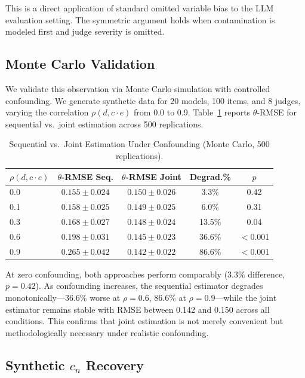 \documentclass[11pt]{article}
\newcommand{\cn}{c_n}
\begin{document}
This is a direct application of standard omitted variable bias \citep{angrist2009mostly} to the LLM evaluation setting. The symmetric argument holds when contamination is modeled first and judge severity is omitted.

\subsection{Monte Carlo Validation}

We validate this observation via Monte Carlo simulation with controlled confounding.
We generate synthetic data for 20 models, 100 items, and 8 judges, varying the correlation $\rho(d, c \cdot e)$ from 0.0 to 0.9.
Table~\ref{tab:mc_confounding} reports $\theta$-RMSE for sequential vs.\ joint estimation across 500 replications.

\begin{table}[t]
\centering
\caption{Sequential vs.\ Joint Estimation Under Confounding (Monte Carlo, 500 replications).}
\label{tab:mc_confounding}
\begin{tabular}{lcccc}
\toprule
$\rho(d, c \!\cdot\! e)$ & $\theta$-RMSE Seq. & $\theta$-RMSE Joint & Degrad.\% & $p$ \\
\midrule
0.0 & $0.155 \pm 0.024$ & $0.150 \pm 0.026$ & 3.3\% & 0.42 \\
0.1 & $0.158 \pm 0.025$ & $0.149 \pm 0.025$ & 6.0\% & 0.31 \\
0.3 & $0.168 \pm 0.027$ & $0.148 \pm 0.024$ & 13.5\% & 0.04 \\
0.6 & $0.198 \pm 0.031$ & $0.145 \pm 0.023$ & 36.6\% & $<$0.001 \\
0.9 & $0.265 \pm 0.042$ & $0.142 \pm 0.022$ & 86.6\% & $<$0.001 \\
\bottomrule
\end{tabular}
\end{table}

At zero confounding, both approaches perform comparably (3.3\% difference, $p=0.42$).
As confounding increases, the sequential estimator degrades monotonically---36.6\% worse at $\rho=0.6$, 86.6\% at $\rho=0.9$---while the joint estimator remains stable with RMSE between 0.142 and 0.150 across all conditions.
This confirms that joint estimation is not merely convenient but methodologically necessary under realistic confounding.

\subsection{Synthetic $\cn$ Recovery}
\end{document}
